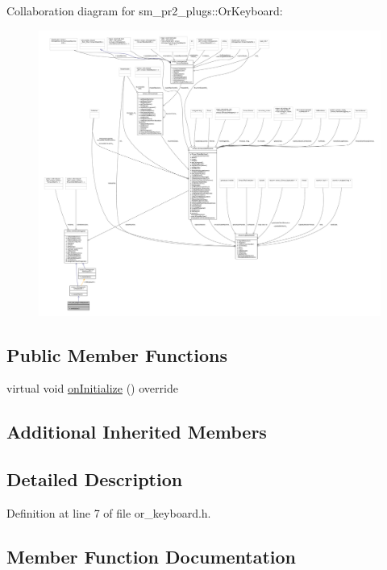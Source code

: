 Collaboration diagram for sm\+\_\+pr2\+\_\+plugs\+:\+:Or\+Keyboard\+:
\nopagebreak
\begin{figure}[H]
\begin{center}
\leavevmode
\includegraphics[width=350pt]{classsm__pr2__plugs_1_1OrKeyboard__coll__graph}
\end{center}
\end{figure}
\subsection*{Public Member Functions}
\begin{DoxyCompactItemize}
\item 
virtual void \hyperlink{classsm__pr2__plugs_1_1OrKeyboard_ad54c87907039f7fb592aada01154353d}{on\+Initialize} () override
\end{DoxyCompactItemize}
\subsection*{Additional Inherited Members}


\subsection{Detailed Description}


Definition at line 7 of file or\+\_\+keyboard.\+h.



\subsection{Member Function Documentation}
